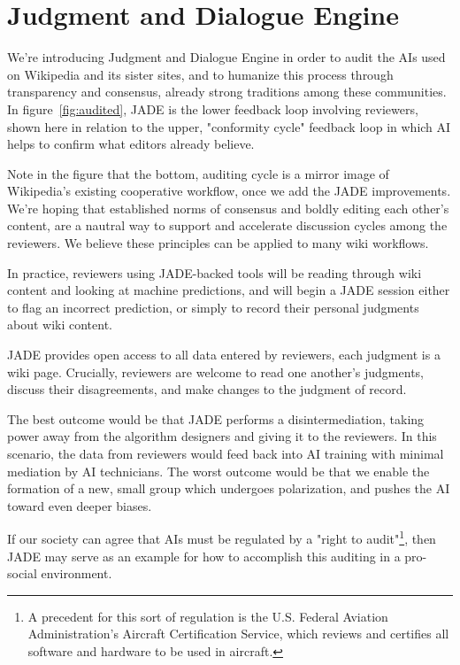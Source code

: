 \documentclass[format=sigconf]{acmart}
\begin{document}
\section{Judgment and Dialogue Engine}

We're introducing Judgment and Dialogue Engine in order to audit the AIs used on Wikipedia and its sister sites, and to humanize this process through transparency and consensus, already strong traditions among these communities.  In figure~\ref{fig:audited}, JADE is the lower feedback loop involving reviewers, shown here in relation to the upper, "conformity cycle" feedback loop in which AI helps to confirm what editors already believe.

Note in the figure that the bottom, auditing cycle is a mirror image of Wikipedia's existing cooperative workflow, once we add the JADE improvements.  We're hoping that established norms of consensus and boldly editing each other's content, are a nautral way to support and accelerate discussion cycles among the reviewers.  We believe these principles can be applied to many wiki workflows.

In practice, reviewers using JADE-backed tools will be reading through wiki content and looking at machine predictions, and will begin a JADE session either to flag an incorrect prediction, or simply to record their personal judgments about wiki content.

JADE provides open access to all data entered by reviewers, each judgment is a wiki page.  Crucially, reviewers are welcome to read one another's judgments, discuss their disagreements, and make changes to the judgment of record.

The best outcome would be that JADE performs a disintermediation, taking power away from the algorithm designers and giving it to the reviewers.  In this scenario, the data from reviewers would feed back into AI training with minimal mediation by AI technicians.  The worst outcome would be that we enable the formation of a new, small group which undergoes polarization, and pushes the AI toward even deeper biases.

If our society can agree that AIs must be regulated by a "right to audit"\footnote{A precedent for this sort of regulation is the U.S. Federal Aviation Administration's Aircraft Certification Service, which reviews and certifies all software and hardware to be used in aircraft.}, then JADE may serve as an example for how to accomplish this auditing in a pro-social environment.


\end{document}
